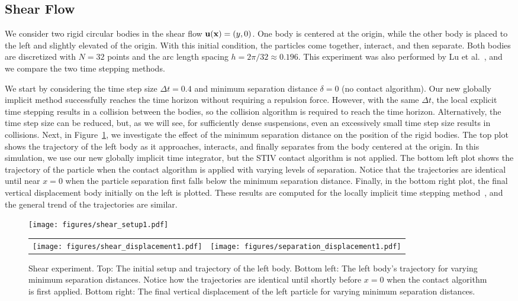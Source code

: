 \documentclass[preprint, 10pt]{elsarticle}
\begin{document}
\subsection{Shear Flow}
We consider two rigid circular bodies in the shear flow ${{\mathbf{u}}}({\mathbf{x}}) =
(y,0)$.  One body is centered at the origin, while the other body is
placed to the left and slightly elevated of the origin.  With this
initial condition, the particles come together, interact, and then
separate.  Both bodies are discretized with $N=32$ points and the arc
length spacing $h = 2\pi/32 \approx 0.196$.  This experiment was also
performed by Lu et al.~\cite{Lu2017}, and we compare the two time
stepping methods.

We start by considering the time step size $\Delta t = 0.4$ and
minimum separation distance $\delta = 0$ (no contact algorithm). 
Our new globally implicit method successfully reaches the time
horizon without requiring a repulsion force.  However, with the same
$\Delta t$, the local explicit time stepping results in a collision
between the bodies, so the collision algorithm is required to reach the
time horizon.  Alternatively, the time step size can be reduced, but, as
we will see, for sufficiently dense suspensions, even an excessively
small time step size results in collisions.  Next, in
Figure~\ref{fig:shear_experiment}, we investigate the effect of the
minimum separation distance on the position of the rigid bodies.  The
top plot shows the trajectory of the left body as it approaches,
interacts, and finally separates from the body centered at the origin.
In this simulation, we use our new globally implicit time integrator,
but the STIV contact algorithm is not applied.  The bottom left plot
shows the trajectory of the particle when the contact algorithm is
applied with varying levels of separation.  Notice that the trajectories
are identical until near $x=0$ when the particle separation first falls
below the minimum separation distance.  Finally, in the bottom right
plot, the final vertical displacement body initially on the left is
plotted.  These results are computed for the locally implicit time
stepping method~\cite{Lu2017}, and the general trend of the trajectories
are similar.
\begin{figure}[!h]
  \begin{center}
    \texttt{[image: figures/shear\_setup1.pdf]}
    \begin{tabular}{c c}
      \texttt{[image: figures/shear\_displacement1.pdf]} &
      \texttt{[image: figures/separation\_displacement1.pdf]}
    \end{tabular}
  \end{center}
\caption{\label{fig:shear_experiment} Shear experiment. Top: The initial
setup and trajectory of the left body.   Bottom left: The left body's
trajectory for varying minimum separation distances.  Notice how
the trajectories are identical until shortly before $x=0$ when the
contact algorithm is first applied.  Bottom right: The final vertical
displacement of the left particle for varying minimum separation
distances.}
\end{figure}
\end{document}
